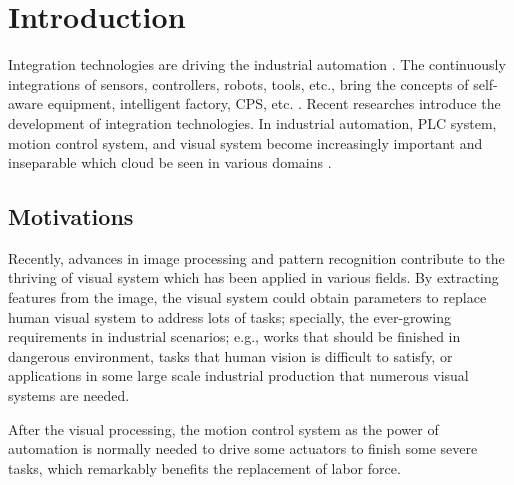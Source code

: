 \documentclass[journal,UTF8]{IEEEtran}
\begin{document}
%
\IEEEpeerreviewmaketitle



\section{Introduction}
Integration technologies are driving the industrial automation \cite{Kazmierkowski2007Integration}. The continuously integrations of sensors, controllers, robots, tools, etc., bring the concepts of self-aware equipment, intelligent factory, CPS, etc. \cite{Wan2018An,Chekired2018Industrial}. Recent researches \cite{Colombo2006An,Vaccaro2010An,Dean2017Integration} introduce the development of integration technologies. In industrial automation, PLC system,  motion control system, and visual system become increasingly important and inseparable which cloud be seen in various domains \cite{Feng2002Integrating,Chang2006Motion,Feng2005Practical}. %

\subsection{Motivations}
Recently, advances in image processing and pattern recognition contribute to the thriving of visual system which has been applied in various fields. By extracting features from the image, the visual system could obtain parameters to replace human visual system to address lots of tasks; specially, the ever-growing requirements in industrial scenarios; e.g., works that should be finished in dangerous environment, tasks that human vision is difficult to satisfy, or applications in some large scale industrial production that numerous visual systems are needed. 

After the visual processing, the motion control system as the power of automation is normally needed to drive some actuators to finish some severe tasks, which remarkably benefits the replacement of labor force. 
\end{document}
